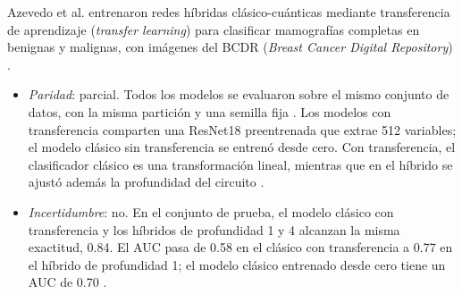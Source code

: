Azevedo et al. entrenaron redes híbridas clásico-cuánticas mediante transferencia de aprendizaje (\textit{transfer learning}) para clasificar mamografías completas en benignas y malignas, con imágenes del BCDR (\textit{Breast Cancer Digital Repository}) \cite{Azevedo2022QuantumTransfer}.
\begin{itemize}
  \item \textit{Paridad}: parcial.
  Todos los modelos se evaluaron sobre el mismo conjunto de datos, con la misma partición y una semilla fija \cite{Azevedo2022QuantumTransfer}.
  Los modelos con transferencia comparten una ResNet18 preentrenada que extrae 512 variables; el modelo clásico sin transferencia se entrenó desde cero. Con transferencia, el clasificador clásico es una transformación lineal, mientras que en el híbrido se ajustó además la profundidad del circuito \cite{Azevedo2022QuantumTransfer}.
  \item \textit{Incertidumbre}: no.
  En el conjunto de prueba, el modelo clásico con transferencia y los híbridos de profundidad 1 y 4 alcanzan la misma exactitud, 0.84. El AUC pasa de 0.58 en el clásico con transferencia a 0.77 en el híbrido de profundidad 1; el modelo clásico entrenado desde cero tiene un AUC de 0.70 \cite{Azevedo2022QuantumTransfer}.

\end{itemize}
